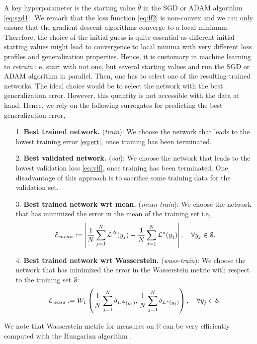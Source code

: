 \documentclass[a4paper]{article}
\numberwithin{equation}{section}
\numberwithin{equation}{section}
\theoremstyle{definition}
\theoremstyle{myremarkstyle}
\newcommand{\R}{\mathbb{R}}
\newcommand{\map}{\EuScript{L}}
\newcommand{\train}{\EuScript{S}}
\newcommand{\er}{\EuScript{E}}
\begin{document}
A key hyperparameter is the starting value $\bar{\theta}$ in the SGD or ADAM algorithm \eqref{eq:sgd1}. We remark that the loss function \eqref{eq:lf2} is non-convex and we can only ensure that the gradient descent algorithms converge to a local minimum. Therefore, the choice of the initial guess is quite essential as different initial starting values might lead to convergence to local minima with very different loss profiles and generalization properties. Hence, it is customary in machine learning to \emph{retrain} i.e, start with not one, but several starting values and run the SGD or ADAM algorithm in parallel. Then, one has to select one of the resulting trained networks. The ideal choice would be to select the network with the best generalization error. However, this quantity is not accessible with the data at hand. Hence, we rely on the following surrogates for predicting the best generalization error,
\begin{itemize}
\item [1.] {\bf Best trained network.} (\emph{train}): We choose the network that leads to the lowest training error \eqref{eq:ert}, once training has been terminated. 
\item [2.] {\bf Best validated network.} (\emph{val}): We choose the network that leads to the lowest validation loss \eqref{eq:vlf}, once training has been terminated. One disadvantage of this approach is to sacrifice some training data for the validation set. 
\item [3.]{\bf Best trained network wrt mean.} (\emph{mean-train}): We choose the network that has minimized the error in the mean of the training set i.e,
\begin{equation}
\label{eq:ermean}
\er_{mean} := \left| \frac{1}{N}\sum\limits_{j=1}^N \map^{\Delta}(y_j) -  \frac{1}{N}\sum\limits_{j=1}^N \map^{\ast}(y_j)\right|, \quad \forall y_j \in \train.
\end{equation}
\item [4.] {\bf Best trained network wrt Wasserstein.} (\emph{wass-train}): We choose the network that has minimized the error in the Wasserstein metric with respect to the training set $\train$:
\begin{equation}
\label{eq:erwass}
\er_{wass} := W_1\left( \frac{1}{N}\sum_{j=1}^N \delta_{\map^{\Delta}(y_j)},   \frac{1}{N}\sum_{j=1}^N \delta_{\map^{\ast}(y_j)} \right), \quad \forall y_j \in \train.
\end{equation}
\end{itemize}
We note that Wasserstein metric for measures on $\R$ can be very efficiently computed with the Hungarian algorithm \cite{HUN1}. 
\end{document}
